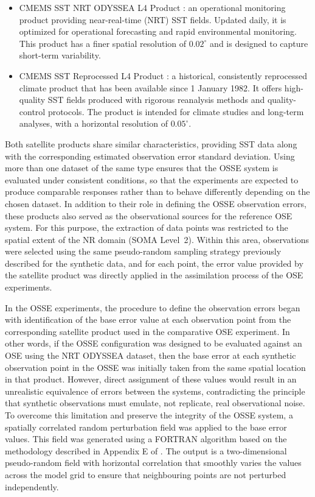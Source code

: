 \begin{itemize}
	\item CMEMS SST NRT ODYSSEA L4 Product \parencite{eucmems2019ho}: an operational monitoring product providing near-real-time (NRT) SST fields. Updated daily, it is optimized for operational forecasting and rapid environmental monitoring. This product has a finer spatial resolution of $0.02^{\circ}$ and is designed to capture short-term variability. 
	\item CMEMS SST Reprocessed L4 Product \parencite{eucmems2019qa}: a historical, consistently reprocessed climate product that has been available since 1 January 1982. It offers high-quality SST fields produced with rigorous reanalysis methods and quality-control protocols. The product is intended for climate studies and long-term analyses, with a horizontal resolution of $0.05^{\circ}$.   
\end{itemize}

Both satellite products share similar characteristics, providing SST data along with the corresponding estimated observation error standard deviation. Using more than one dataset of the same type ensures that the OSSE system is evaluated under consistent conditions, so that the experiments are expected to produce comparable responses rather than to behave differently depending on the chosen dataset. In addition to their role in defining the OSSE observation errors, these products also served as the observational sources for the reference OSE system. For this purpose, the extraction of data points was restricted to the spatial extent of the NR domain (SOMA Level~2). Within this area, observations were selected using the same pseudo-random sampling strategy previously described for the synthetic data, and for each point, the error value provided by the satellite product was directly applied in the assimilation process of the OSE experiments.

In the OSSE experiments, the procedure to define the observation errors began with identification of the base error value at each observation point from the corresponding satellite product used in the comparative OSE experiment. In other words, if the OSSE configuration was designed to be evaluated against an OSE using the NRT ODYSSEA dataset, then the base error at each synthetic observation point in the OSSE was initially taken from the same spatial location in that product. However, direct assignment of these values would result in an unrealistic equivalence of errors between the systems, contradicting the principle that synthetic observations must emulate, not replicate, real observational noise. To overcome this limitation and preserve the integrity of the OSSE system, a spatially correlated random perturbation field was applied to the base error values. This field was generated using a FORTRAN algorithm based on the methodology described in Appendix E of \parencite{evensen2003ensemble}. The output is a two-dimensional pseudo-random field with horizontal correlation that smoothly varies the values across the model grid to ensure that neighbouring points are not perturbed independently.

